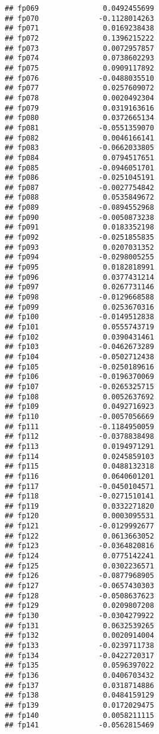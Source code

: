 \documentclass[]{article}
\begin{document}
\begin{verbatim}
## fp069               0.0492455699
## fp070              -0.1128014263
## fp071               0.0169238438
## fp072               0.1396215222
## fp073               0.0072957857
## fp074               0.0738602293
## fp075               0.0909117892
## fp076              -0.0488035510
## fp077               0.0257609072
## fp078               0.0020492304
## fp079               0.0319163616
## fp080               0.0372665134
## fp081              -0.0551359070
## fp082               0.0046166141
## fp083              -0.0662033805
## fp084               0.0794517651
## fp085              -0.0946051701
## fp086              -0.0251045191
## fp087              -0.0027754842
## fp088               0.0535849672
## fp089              -0.0894552968
## fp090              -0.0050873238
## fp091               0.0183352198
## fp092              -0.0251855835
## fp093               0.0207031352
## fp094              -0.0298005255
## fp095               0.0182818991
## fp096               0.0377431214
## fp097               0.0267731146
## fp098              -0.0129668588
## fp099               0.0253670316
## fp100              -0.0149512838
## fp101               0.0555743719
## fp102               0.0390431461
## fp103              -0.0462673289
## fp104              -0.0502712438
## fp105              -0.0250189616
## fp106              -0.0196370069
## fp107              -0.0265325715
## fp108               0.0052637692
## fp109               0.0492716923
## fp110              -0.0057056669
## fp111              -0.1184950059
## fp112              -0.0378838498
## fp113               0.0194971291
## fp114               0.0245859103
## fp115               0.0488132318
## fp116               0.0640601201
## fp117              -0.0450104571
## fp118              -0.0271510141
## fp119               0.0332271820
## fp120               0.0003095531
## fp121              -0.0129992677
## fp122               0.0613663052
## fp123              -0.0364820816
## fp124               0.0775142241
## fp125               0.0302236571
## fp126              -0.0877968905
## fp127              -0.0657430303
## fp128              -0.0508637623
## fp129               0.0209807208
## fp130              -0.0304279922
## fp131               0.0632539265
## fp132               0.0020914004
## fp133              -0.0239711738
## fp134              -0.0422720317
## fp135               0.0596397022
## fp136               0.0406703432
## fp137               0.0318714886
## fp138               0.0484159129
## fp139               0.0172029475
## fp140               0.0058211115
## fp141              -0.0562815469

\end{verbatim}
\end{document}
